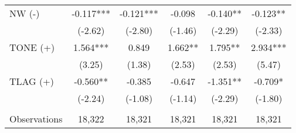\begin{table}[H]
\begin{tabular}{lccccc}
		\midrule
		NW (-) & -0.117*** & -0.121*** & -0.098 & -0.140** & -0.123** \\
		& (-2.62) & (-2.80) & (-1.46) & (-2.29) & (-2.33) \\
		TONE (+) & 1.564*** & 0.849 & 1.662** & 1.795** & 2.934*** \\
		& (3.25) & (1.38) & (2.53) & (2.53) & (5.47) \\
		TLAG (+) & -0.560** & -0.385 & -0.647 & -1.351** & -0.709* \\
		& (-2.24) & (-1.08) & (-1.14) & (-2.29) & (-1.80) \\
		&   &   &   &   &  \\
		Observations & 18,322 & 18,321 & 18,321 & 18,321 & 18,321 \\
		\bottomrule
		\bottomrule
	\end{tabular}%
\end{table}%
